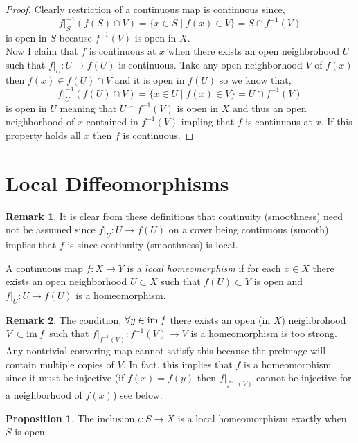 \documentclass[12pt]{extarticle}
\theoremstyle{definition}
\newtheorem{proposition}[theorem]{Proposition}
\newtheorem{remark}{Remark}
\newenvironment{definition}[1][Definition:]{\begin{trivlist}
\item[\hskip \labelsep {\bfseries #1}]}{\end{trivlist}}
\begin{document}
\begin{proof}
Clearly restriction of a continuous map is continuous since,
\[ f|_S^{-1}(f(S) \cap V) = \{ x \in S \mid f(x) \in V \} = S \cap f^{-1}(V) \] is open in $S$ because $f^{-1}(V)$ is open in $X$.
\bigskip\\
Now I claim that $f$ is continuous at $x$ when there exists an open neighbrohood $U$ such that $f|_U : U \to f(U)$ is continuous. Take any open neighborhood $V$ of $f(x)$ then $f(x) \in f(U) \cap V$ and it is open in $f(U)$ so we know that,
\[ f|_U^{-1}(f(U) \cap V) = \{ x \in U \mid f(x) \in V \} = U \cap f^{-1}(V) \]
is open in $U$ meaning that $U \cap f^{-1}(V)$ is open in $X$ and thus an open neighborhood of $x$ contained in $f^{-1}(V)$ impling that $f$ is continuous at $x$. If this property holds all $x$ then $f$ is continuous.
\end{proof}

\section{Local Diffeomorphisms}

\begin{remark}
It is clear from these definitions that continuity (smoothness) need not be assumed since $f|_U : U \to f(U)$ on a cover being continuous (smooth) implies that $f$ is since continuity (smoothness) is local.
\end{remark}


\begin{definition}
A continuous map $f : X \to Y$ is a \textit{local homeomorphism} if for each $x \in X$ there exists an open neighborhood $U \subset X$ such that $f(U) \subset Y$ is open and $f|_U : U \to f(U)$ is a homeomorphism.
\end{definition}

\begin{remark}
The condition, $\forall y \in \mathrm{im} \:{f}$ there exists an open (in $X$) neighbrohood $V \subset \mathrm{im} \:{f}$ such that $f |_{f^{-1}(V)} : f^{-1}(V) \to V$ is a homeomorphism is too strong. Any nontrivial convering map cannot satisfy this because the preimage will contain multiple copies of $V$. In fact, this implies that $f$ is a homeomorphism since it must be injective (if $f(x) = f(y)$ then $f|_{f^{-1}(V)}$ cannot be injective for a neighborhood of $f(x)$) see below.
\end{remark}

\begin{proposition}
The inclusion $\iota : S \to X$ is a local homeomorphism exactly when $S$ is open.
\end{proposition}
\end{document}
